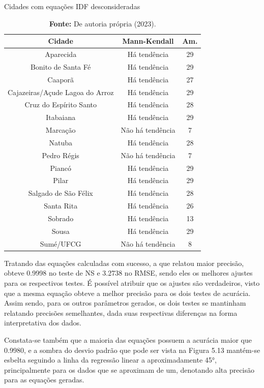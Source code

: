 \begin{table}[ht]
\centering
\caption{Cidades com equações IDF desconsideradas}
\begin{tabular}{ccc}
\hline
\textbf{Cidade} & \textbf{Mann-Kendall} & \textbf{Am.} \\ \hline
Aparecida & Há tendência & 29 \\
Bonito de Santa Fé & Há tendência & 29 \\
Caaporã & Há tendência & 27 \\
Cajazeiras/Açude Lagoa do Arroz & Há tendência & 29 \\
Cruz do Espírito Santo & Há tendência & 28 \\
Itabaiana & Há tendência & 29 \\
Marcação & Não há tendência & 7 \\
Natuba & Há tendência & 28 \\
Pedro Régis & Não há tendência & 7 \\
Piancó & Há tendência & 29 \\
Pilar & Há tendência & 29 \\
Salgado de São Félix & Há tendência & 28 \\
Santa Rita & Há tendência & 26 \\
Sobrado & Há tendência & 13 \\
Sousa & Há tendência & 29 \\
Sumé/UFCG & Não há tendência & 8 \\ \hline
\end{tabular}
\caption*{\textbf{Fonte:} De autoria própria (2023).}
\end{table}

Tratando das equações calculadas com sucesso, a que relatou maior precisão, obteve 0.9998 no teste de NS e 3.2738 no RMSE, sendo eles os melhores ajustes para os respectivos testes. É possível atribuir que os ajustes são verdadeiros, visto que a mesma equação obteve a melhor precisão para os dois testes de acurácia. Assim sendo, para os outros parâmetros gerados, os dois testes se mantinham relatando precisões semelhantes, dada suas respectivas diferenças na forma interpretativa dos dados.

Constata-se também que a maioria das equações possuem a acurácia maior que 0.9980, e a sombra do desvio padrão que pode ser vista na Figura 5.13 mantém-se esbelta seguindo a linha da regressão linear a aproximadamente 45°, principalmente para os dados que se aproximam de um, denotando alta precisão para as equações geradas.

